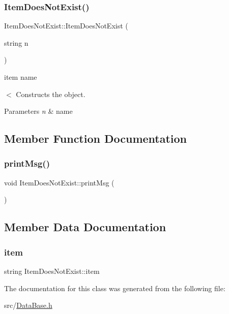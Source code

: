 \subsubsection{\texorpdfstring{Item\+Does\+Not\+Exist()}{ItemDoesNotExist()}}
{\footnotesize\ttfamily Item\+Does\+Not\+Exist\+::\+Item\+Does\+Not\+Exist (\begin{DoxyParamCaption}\item[{string}]{n }\end{DoxyParamCaption})\hspace{0.3cm}{\ttfamily [inline]}}



item name 

$<$ Constructs the object.


\begin{DoxyParams}{Parameters}
{\em n} & name \\
\hline
\end{DoxyParams}


\subsection{Member Function Documentation}
\mbox{\label{classItemDoesNotExist_ac043ce235a565e8766cf55b32a2aa80c}} 
\subsubsection{\texorpdfstring{print\+Msg()}{printMsg()}}
{\footnotesize\ttfamily void Item\+Does\+Not\+Exist\+::print\+Msg (\begin{DoxyParamCaption}{ }\end{DoxyParamCaption})\hspace{0.3cm}{\ttfamily [inline]}}



\subsection{Member Data Documentation}
\mbox{\label{classItemDoesNotExist_ac1848f31f6668f41a166b4976189ec0f}} 
\subsubsection{\texorpdfstring{item}{item}}
{\footnotesize\ttfamily string Item\+Does\+Not\+Exist\+::item\hspace{0.3cm}{\ttfamily [private]}}



The documentation for this class was generated from the following file\+:\begin{DoxyCompactItemize}
\item 
src/\hyperlink{DataBase_8h}{Data\+Base.\+h}\end{DoxyCompactItemize}
